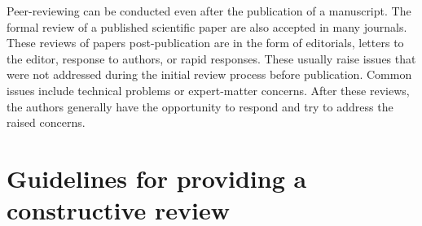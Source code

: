 \documentclass[
]{book}
\begin{document}
Peer-reviewing can be conducted even after the publication of a manuscript. The formal review of a published scientific paper are also accepted in many journals. These reviews of papers post-publication are in the form of editorials, letters to the editor, response to authors, or rapid responses. These usually raise issues that were not addressed during the initial review process before publication. Common issues include technical problems or expert-matter concerns. After these reviews, the authors generally have the opportunity to respond and try to address the raised concerns.

\hypertarget{guidelines-for-providing-a-constructive-review}{%
\section{Guidelines for providing a constructive review}\label{guidelines-for-providing-a-constructive-review}}
\end{document}

